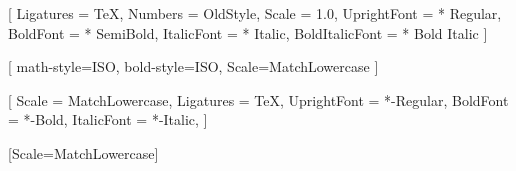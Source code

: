 \usepackage{amsmath}

\usepackage{fontspec}
\usepackage{unicode-math}

\setmainfont{UCL Sans}[
  Ligatures = TeX,
  Numbers   = OldStyle,
  Scale = 1.0,
	UprightFont    = * Regular,
	BoldFont       = * SemiBold,
	ItalicFont     = * Italic,
	BoldItalicFont = * Bold Italic
]

[
  math-style=ISO, 
	bold-style=ISO,
	Scale=MatchLowercase
]

\setsansfont{Inter}[
  Scale       = MatchLowercase,
  Ligatures   = TeX,
  UprightFont = *-Regular,
  BoldFont    = *-Bold,
  ItalicFont  = *-Italic,
]

\setmonofont{Source Code Pro}[Scale=MatchLowercase]

\usepackage[
  a4paper,
  margin = 2cm]{geometry}